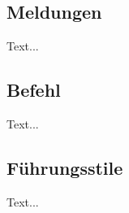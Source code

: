 \documentclass[notes]{beamer} %
\begin{document}
	\subsection{Meldungen}
	\begin{frame}{\subsecname}
		
		Text...
		
	\end{frame}

	\subsection{Befehl}
	\begin{frame}{\subsecname}
		
		Text...
		
	\end{frame}

	\subsection{Führungsstile}
	\begin{frame}{\subsecname}
		
		Text...
		
	\end{frame}
	
\end{document}
